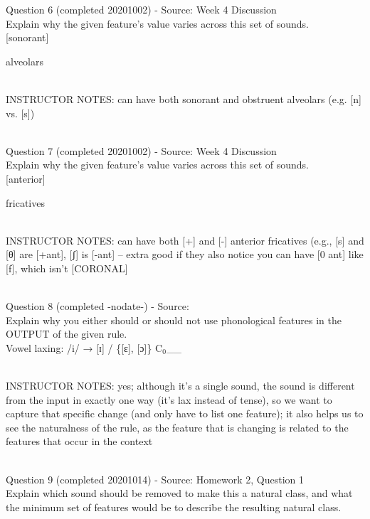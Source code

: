 \documentclass[12pt]{article}
\begin{document}
{\large Question 6} (completed 20201002) - Source: Week 4 Discussion\\

Explain why the given feature's value varies across this set of sounds.\\

{[sonorant]}

alveolars


~\\
INSTRUCTOR NOTES: can have both sonorant and obstruent alveolars (e.g. [n] vs. [s])


~\\

{\large Question 7} (completed 20201002) - Source: Week 4 Discussion\\

Explain why the given feature's value varies across this set of sounds.\\

{[anterior]}

fricatives


~\\
INSTRUCTOR NOTES: can have both [+] and [-] anterior fricatives (e.g., [s] and [θ] are [+ant], [ʃ] is [-ant] -- extra good if they also notice you can have [0 ant] like [f], which isn't [CORONAL]


~\\

{\large Question 8} (completed -nodate-) - Source: \\

Explain why you either should or should not use phonological features in the OUTPUT of the given rule.\\

Vowel laxing: /i/ → {[ɪ]} / \{{[ɛ]}, {[ɔ]}\} C$_0$\_\_


~\\
INSTRUCTOR NOTES: yes; although it's a single sound, the sound is different from the input in exactly one way (it's lax instead of tense), so we want to capture that specific change (and only have to list one feature); it also helps us to see the naturalness of the rule, as the feature that is changing is related to the features that occur in the context


~\\

{\large Question 9} (completed 20201014) - Source: Homework 2, Question 1\\

Explain which sound should be removed to make this a natural class, and what the minimum set of features would be to describe the resulting natural class.\\
\end{document}
